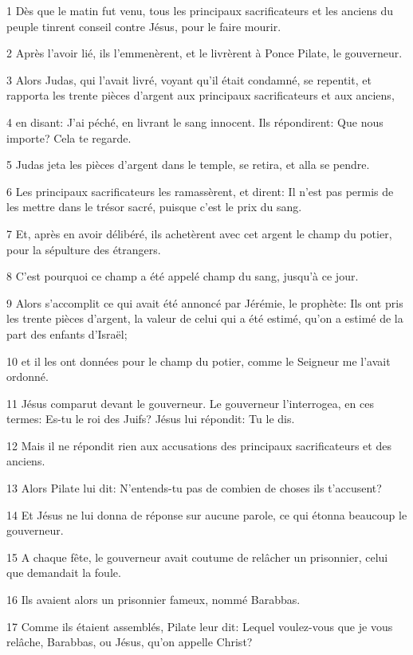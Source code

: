 \par 1 Dès que le matin fut venu, tous les principaux sacrificateurs et les anciens du peuple tinrent conseil contre Jésus, pour le faire mourir.
\par 2 Après l'avoir lié, ils l'emmenèrent, et le livrèrent à Ponce Pilate, le gouverneur.
\par 3 Alors Judas, qui l'avait livré, voyant qu'il était condamné, se repentit, et rapporta les trente pièces d'argent aux principaux sacrificateurs et aux anciens,
\par 4 en disant: J'ai péché, en livrant le sang innocent. Ils répondirent: Que nous importe? Cela te regarde.
\par 5 Judas jeta les pièces d'argent dans le temple, se retira, et alla se pendre.
\par 6 Les principaux sacrificateurs les ramassèrent, et dirent: Il n'est pas permis de les mettre dans le trésor sacré, puisque c'est le prix du sang.
\par 7 Et, après en avoir délibéré, ils achetèrent avec cet argent le champ du potier, pour la sépulture des étrangers.
\par 8 C'est pourquoi ce champ a été appelé champ du sang, jusqu'à ce jour.
\par 9 Alors s'accomplit ce qui avait été annoncé par Jérémie, le prophète: Ils ont pris les trente pièces d'argent, la valeur de celui qui a été estimé, qu'on a estimé de la part des enfants d'Israël;
\par 10 et il les ont données pour le champ du potier, comme le Seigneur me l'avait ordonné.
\par 11 Jésus comparut devant le gouverneur. Le gouverneur l'interrogea, en ces termes: Es-tu le roi des Juifs? Jésus lui répondit: Tu le dis.
\par 12 Mais il ne répondit rien aux accusations des principaux sacrificateurs et des anciens.
\par 13 Alors Pilate lui dit: N'entends-tu pas de combien de choses ils t'accusent?
\par 14 Et Jésus ne lui donna de réponse sur aucune parole, ce qui étonna beaucoup le gouverneur.
\par 15 A chaque fête, le gouverneur avait coutume de relâcher un prisonnier, celui que demandait la foule.
\par 16 Ils avaient alors un prisonnier fameux, nommé Barabbas.
\par 17 Comme ils étaient assemblés, Pilate leur dit: Lequel voulez-vous que je vous relâche, Barabbas, ou Jésus, qu'on appelle Christ?

